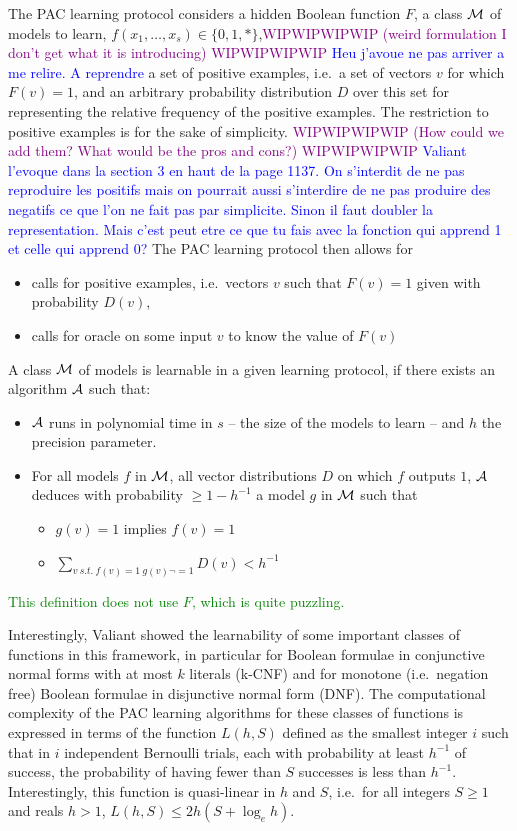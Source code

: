 \documentclass{llncs}
\newcommand{\wip}[1]{\textcolor{Purple}{WIPWIPWIPWIP #1 WIPWIPWIPWIP}}
\newcommand{\francois}[1]{\textcolor{blue}{#1}}
\newcommand{\sylvain}[1]{\textcolor{green}{#1}}
\begin{document}
The PAC learning protocol considers a hidden Boolean function $F$,
a class $\cal M$ of models to learn, $f(x_1,\dots,x_s) \in \{0,1,*\}$,\wip{(weird formulation I don't get what it is introducing)}
\francois{Heu j'avoue ne pas arriver a me relire. A reprendre}
a set of positive examples, i.e.~a set of vectors $v$ for which $F(v)=1$,
and an arbitrary probability distribution $D$ over this set
for representing the relative frequency of the positive examples.
The restriction to positive examples is for the sake of simplicity.
\wip{(How could we add them? What would be the pros and cons?)}
\francois{Valiant l'evoque dans la section 3 en haut de la page 1137. On s'interdit de ne pas reproduire les positifs mais on pourrait aussi s'interdire de ne pas produire des negatifs ce que l'on ne fait pas par simplicite. Sinon il faut doubler la representation. Mais c'est peut etre ce que tu fais avec la fonction qui apprend 1 et celle qui apprend 0?}
The PAC learning protocol then allows for
\begin{itemize}
  \item
calls for positive examples, i.e.~vectors $v$ such that $F(v)=1$ given with probability $D(v)$,
  \item
calls for oracle on some input $v$ to know the value of $F(v)$
\end{itemize}


A class $\cal M$ of models is learnable in a given learning protocol, if there exists an algorithm $\cal A$ such that:
\begin{itemize}
  \item
$\cal A$ runs in polynomial time in $s$ -- the size of the models to learn -- and $h$ the precision parameter.
  \item
For all models $f$ in $\cal M$,
all vector distributions $D$ on which $f$ outputs $1$,
$\cal A$ deduces with probability $\ge 1-h^{-1}$ a model $g$ in $\cal M$ such that
\begin{itemize}
  \item
$g(v)=1$ implies $f(v)=1$
\item
$\sum_{v\ s.t.~f(v)=1\ g(v)\neg=1} D(v) < h^{-1}$
\end{itemize}
\end{itemize}

\sylvain{This definition does not use $F$, which is quite puzzling.}


Interestingly, Valiant showed the learnability of some important classes of functions in this framework,
in particular for Boolean formulae in conjunctive normal forms with at most $k$ literals (k-CNF)
and for monotone (i.e.~negation free) Boolean formulae in disjunctive normal form (DNF).
The computational complexity of the PAC learning algorithms for these classes of functions is expressed in terms of the function
$L(h,S)$ defined as the smallest integer $i$ such that
in $i$ independent Bernoulli trials, each with probability at least $h^{-1}$ of success, the probability of having fewer than $S$ successes is less than $h^{-1}$.
Interestingly, this function is quasi-linear in $h$ and $S$, i.e.~for all
integers $S\ge 1$ and reals $h>1$, $L(h,S) \le 2h(S+\log_e h)$.
\end{document}
